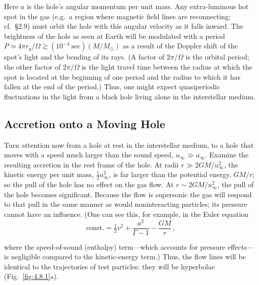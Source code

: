 Here $a$ is the hole's angular momentum per unit mass.  Any extra-luminous hot
spot in the gas (e.g.\ a region where magnetic field lines are reconnecting; cf.\
\S2.9) must orbit the hole with this angular velocity as it falls inward.  The
brightness of the hole as seen at Earth will be modulated with a period
$P \simeq 4\pi r_g/\Omega \gtrsim (10^{-4}~\text{sec})(M/M_\odot)$ as a result of the Doppler shift of the spot's
light and the bending of its rays.  (A factor of $2\pi/\Omega$ is the orbital period; the
other factor of $2\pi/\Omega$ is the light travel time between the radius at which the
spot is located at the beginning of one period and the radius to which it has
fallen at the end of the period.)  Thus, one might expect quasiperiodic
fluctuations in the light from a black hole living alone in the interstellar medium.


\subsection{Accretion onto a Moving Hole}
\label{sec:4.8}

Turn attention now from a hole at rest in the interstellar medium, to a hole that
moves with a speed much larger than the sound speed, $u_\infty \gg a_\infty$. Examine the
resulting accretion in the rest frame of the hole. At radii $r \gg 2GM/u_\infty^2$, the kinetic
energy per unit mass, $\frac{1}{2}u_\infty^2$, is far larger than the potential energy, $GM/r$; so the
pull of the hole has no effect on the gas flow. At $r \sim 2GM/u_\infty^2$, the pull of the
hole becomes significant. Because the flow is supersonic the gas will respond to
that pull in the same manner as would noninteracting particles; its pressure
cannot have an influence. (One can see this, for example, in the Euler equation
%
\begin{equation}
\text{const.} = \tfrac{1}{2}v^2 + \frac{a^2}{\Gamma - 1} - \frac{GM}{r}\,,
\tag{4.8.1}
\end{equation}

where the speed-of-sound (enthalpy) term---which accounts for pressure effects---is
negligible compared to the kinetic-energy term.) Thus, the flow lines will be
identical to the trajectories of test particles: they will be hyperbolae
(Fig.~\ref{fig:4.8.1}a).

